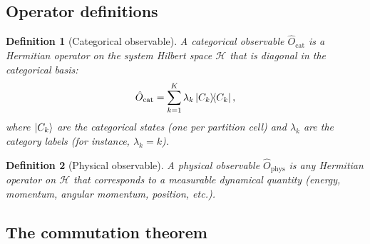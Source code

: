 \documentclass[11pt,twocolumn,a4paper]{article}
\newtheorem{definition}{Definition}
\newcommand{\Ocat}{\hat{O}_{\mathrm{cat}}}
\newcommand{\Ophys}{\hat{O}_{\mathrm{phys}}}
\newcommand{\hilbert}{\mathcal{H}}
\begin{document}
\subsection{Operator definitions}

\begin{definition}[Categorical observable]\label{def:catobs}
A categorical observable $\Ocat$ is a Hermitian operator on the system Hilbert space $\hilbert$ that is diagonal in the categorical basis:
\begin{equation}\label{eq:Ocat}
\Ocat = \sum_{k=1}^{K} \lambda_k \ketbra{C_k}{C_k},
\end{equation}
where $\ket{C_k}$ are the categorical states (one per partition cell) and $\lambda_k$ are the category labels (for instance, $\lambda_k = k$).
\end{definition}

\begin{definition}[Physical observable]\label{def:physobs}
A physical observable $\Ophys$ is any Hermitian operator on $\hilbert$ that corresponds to a measurable dynamical quantity (energy, momentum, angular momentum, position, etc.).
\end{definition}

\subsection{The commutation theorem}
\end{document}
